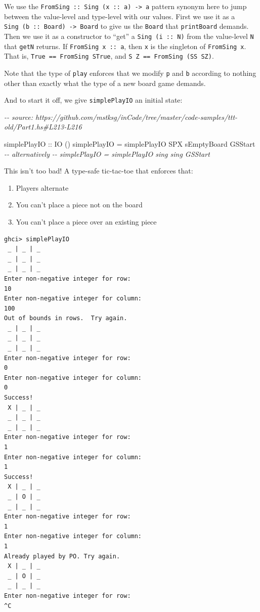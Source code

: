\documentclass[]{article}
\newenvironment{Shaded}{}{}
\newcommand{\CommentTok}[1]{\textcolor[rgb]{0.38,0.63,0.69}{\textit{#1}}}
\newcommand{\DataTypeTok}[1]{\textcolor[rgb]{0.56,0.13,0.00}{#1}}
\newcommand{\NormalTok}[1]{#1}
\newcommand{\OtherTok}[1]{\textcolor[rgb]{0.00,0.44,0.13}{#1}}
\begin{document}
We use the \texttt{FromSing\ ::\ Sing\ (x\ ::\ a)\ -\textgreater{}\ a} pattern
synonym here to jump between the value-level and type-level with our values.
First we use it as a \texttt{Sing\ (b\ ::\ Board)\ -\textgreater{}\ Board} to
give us the \texttt{Board} that \texttt{printBoard} demands. Then we use it as a
constructor to ``get'' a \texttt{Sing\ (i\ ::\ N)} from the value-level
\texttt{N} that \texttt{getN} returns. If \texttt{FromSing\ x\ ::\ a}, then
\texttt{x} is the singleton of \texttt{FromSing\ x}. That is,
\texttt{True\ ==\ FromSing\ STrue}, and \texttt{S\ Z\ ==\ FromSing\ (SS\ SZ)}.

Note that the type of \texttt{play} enforces that we modify \texttt{p} and
\texttt{b} according to nothing other than exactly what the type of a new board
game demands.

And to start it off, we give \texttt{simplePlayIO\textquotesingle{}} an initial
state:

\begin{Shaded}
\begin{Highlighting}[]
\CommentTok{{-}{-} source: https://github.com/mstksg/inCode/tree/master/code{-}samples/ttt{-}old/Part1.hs\#L213{-}L216}

\OtherTok{simplePlayIO ::} \DataTypeTok{IO}\NormalTok{ ()}
\NormalTok{simplePlayIO }\OtherTok{=}\NormalTok{ simplePlayIO\textquotesingle{} }\DataTypeTok{SPX}\NormalTok{ sEmptyBoard }\DataTypeTok{GSStart}
\CommentTok{{-}{-} alternatively}
\CommentTok{{-}{-} simplePlayIO = simplePlayIO\textquotesingle{} sing sing GSStart}
\end{Highlighting}
\end{Shaded}

This isn't too bad! A type-safe tic-tac-toe that enforces that:

\begin{enumerate}
\def\labelenumi{\arabic{enumi}.}
\tightlist
\item
  Players alternate
\item
  You can't place a piece not on the board
\item
  You can't place a piece over an existing piece
\end{enumerate}

\begin{verbatim}
ghci> simplePlayIO
 _ | _ | _
 _ | _ | _
 _ | _ | _
Enter non-negative integer for row:
10
Enter non-negative integer for column:
100
Out of bounds in rows.  Try again.
 _ | _ | _
 _ | _ | _
 _ | _ | _
Enter non-negative integer for row:
0
Enter non-negative integer for column:
0
Success!
 X | _ | _
 _ | _ | _
 _ | _ | _
Enter non-negative integer for row:
1
Enter non-negative integer for column:
1
Success!
 X | _ | _
 _ | O | _
 _ | _ | _
Enter non-negative integer for row:
1
Enter non-negative integer for column:
1
Already played by PO. Try again.
 X | _ | _
 _ | O | _
 _ | _ | _
Enter non-negative integer for row:
^C
\end{verbatim}
\end{document}
